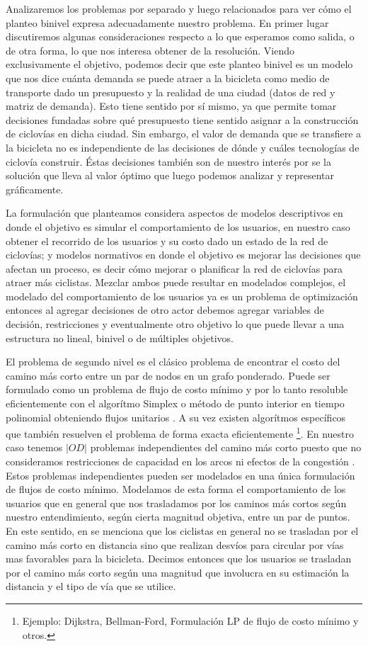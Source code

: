 Analizaremos los problemas por separado y luego relacionados para ver cómo el planteo binivel expresa adecuadamente nuestro problema. En primer lugar discutiremos algunas consideraciones respecto a lo que esperamos como salida, o de otra forma, lo que nos interesa obtener de la resolución. Viendo exclusivamente el objetivo, podemos decir que este planteo binivel es un modelo que nos dice cuánta demanda se puede atraer a la bicicleta como medio de transporte dado un presupuesto y la realidad de una ciudad (datos de red y matriz de demanda). Esto tiene sentido por sí mismo, ya que permite tomar decisiones fundadas sobre qué presupuesto tiene sentido asignar a la construcción de ciclovías en dicha ciudad. Sin embargo, el valor de demanda que se transfiere a la bicicleta no es independiente de las decisiones de dónde y cuáles tecnologías de ciclovía construir. Éstas decisiones también son de nuestro interés por se la solución que lleva al valor óptimo que luego podemos analizar y representar gráficamente.

La formulación que planteamos considera aspectos de modelos descriptivos en donde el objetivo es simular el comportamiento de los usuarios, en nuestro caso obtener el recorrido de los usuarios y su costo dado un estado de la red de ciclovías; y modelos normativos en donde el objetivo es mejorar las decisiones que afectan un proceso, es decir cómo mejorar o planificar la red de ciclovías para atraer más ciclistas. Mezclar ambos puede resultar en modelados complejos, el modelado del comportamiento de los usuarios ya es un problema de optimización entonces al agregar decisiones de otro actor debemos agregar variables de decisión, restricciones y eventualmente otro objetivo lo que puede llevar a una estructura no lineal, binivel o de múltiples objetivos.

El problema de segundo nivel es el clásico problema de encontrar el costo del camino más corto entre un par de nodos en un grafo ponderado. Puede ser formulado como un problema de flujo de costo mínimo y por lo tanto resoluble eficientemente con el algorítmo Simplex o método de punto interior en tiempo polinomial obteniendo flujos unitarios \parencite{networkflowsbook}. A su vez existen algorítmos específicos que también resuelven el problema de forma exacta eficientemente \footnote{Ejemplo: Dijkstra, Bellman-Ford, Formulación LP de flujo de costo mínimo y otros.}. En nuestro caso tenemos $|OD|$ problemas independientes del camino más corto puesto que no consideramos restricciones de capacidad en los arcos ni efectos de la congestión \parencite{Sheffi1985}. Estos problemas independientes pueden ser modelados en una única formulación de flujos de costo mínimo. Modelamos de esta forma el comportamiento de los usuarios que en general que nos trasladamos por los caminos más cortos según nuestro entendimiento, según cierta magnitud objetiva, entre un par de puntos. En este sentido, en \cite{winters2010} se menciona que los ciclistas en general no se trasladan por el camino más corto en distancia sino que realizan desvíos para circular por vías mas favorables para la bicicleta. Decimos entonces que los usuarios se trasladan por el camino más corto según una magnitud que involucra en su estimación la distancia y el tipo de vía que se utilice.

